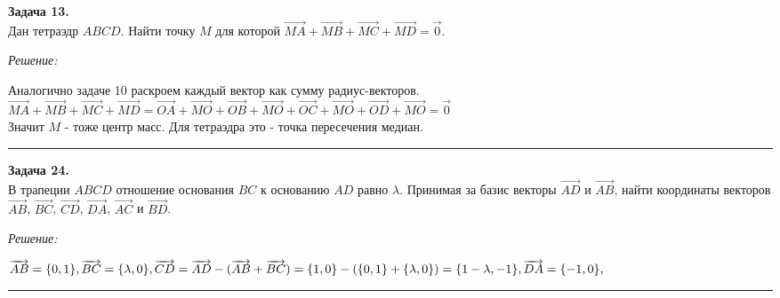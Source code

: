 \documentclass[a4paper, 12pt]{article}
\newenvironment{problem}[2][Задача]
    { \begin{mdframed}[backgroundcolor=gray!10] \textbf{#1 #2.} \\}
    {  \end{mdframed}}
\newenvironment{solution}
    {\textit{Решение: }}
    {\noindent\rule{7in}{1.5pt}}
\begin{document}
\begin{problem}{13}
Дан тетраэдр $ABCD$. Найти точку $M$ для которой
$
\overrightarrow{MA} +
\overrightarrow{MB} +
\overrightarrow{MC} +
\overrightarrow{MD} = \vec{0}
$.
\end{problem}
\begin{solution}

Аналогично задаче 10 раскроем каждый вектор как сумму радиус-векторов. \\
$
\overrightarrow{MA} + \overrightarrow{MB} + \overrightarrow{MC} + \overrightarrow{MD} =
\overrightarrow{OA} + \overrightarrow{MO} +
\overrightarrow{OB} + \overrightarrow{MO} +
\overrightarrow{OC} + \overrightarrow{MO} +
\overrightarrow{OD} + \overrightarrow{MO} = \vec{0}
$
\\
Значит $M$ - тоже центр масс. Для тетраэдра это - точка пересечения медиан.

\end{solution}

\begin{problem}{24}
В трапеции $ABCD$ отношение основания $BC$ к основанию $AD$ равно $\lambda$. Принимая за базис
векторы $\overrightarrow{AD}$ и $\overrightarrow{AB}$, найти координаты векторов
$\overrightarrow{AB}$, $\overrightarrow{BC}$, $\overrightarrow{CD}$, $\overrightarrow{DA}$,
$\overrightarrow{AC}$ и $\overrightarrow{BD}$.
\end{problem}
\begin{solution}

$
\overrightarrow{AB} = \{0, 1\}, \\
\overrightarrow{BC} = \{\lambda, 0\}, \\
\overrightarrow{CD} = \overrightarrow{AD} - (\overrightarrow{AB} + \overrightarrow{BC}) = \{1, 0\} - (\{0, 1\} + \{\lambda, 0\}) = \{1 - \lambda, -1\}, \\
\overrightarrow{DA} = \{-1, 0\}, \\
$

\end{solution}
\end{document}
